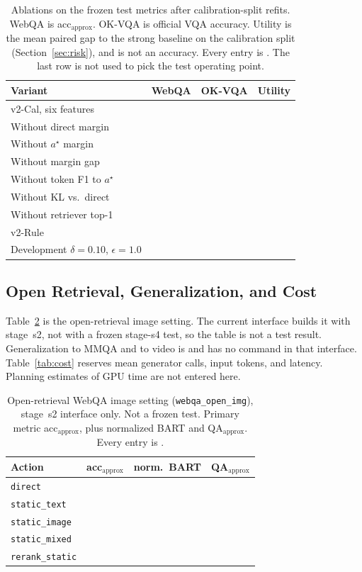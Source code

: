 \begin{table}[t]
\caption{Ablations on the frozen test metrics after calibration-split refits.
WebQA is acc$_{\mathrm{approx}}$.
OK-VQA is official VQA accuracy.
Utility is the mean paired gap to the strong baseline on the calibration split (Section~\ref{sec:risk}), and is not an accuracy.
Every entry is \ph{}.
The last row is not used to pick the test operating point.}
\label{tab:ablation}
\scriptsize
\setlength{\tabcolsep}{3pt}
\begin{tabular}{@{}lccc@{}}
\toprule
Variant & WebQA & OK-VQA & Utility \\
\midrule
v2-Cal, six features & \ph{} & \ph{} & \ph{} \\
Without direct margin & \ph{} & \ph{} & \ph{} \\
Without $a^{\star}$ margin & \ph{} & \ph{} & \ph{} \\
Without margin gap & \ph{} & \ph{} & \ph{} \\
Without token F1 to $a^{\star}$ & \ph{} & \ph{} & \ph{} \\
Without KL vs.\ direct & \ph{} & \ph{} & \ph{} \\
Without retriever top-1 & \ph{} & \ph{} & \ph{} \\
v2-Rule & \ph{} & \ph{} & \ph{} \\
Development $\delta=0.10$, $\epsilon=1.0$ & \ph{} & \ph{} & \ph{} \\
\bottomrule
\end{tabular}
\end{table}

\subsection{Open Retrieval, Generalization, and Cost}
\label{sec:extra}
Table~\ref{tab:open} is the open-retrieval image setting.
The current interface builds it with stage~s2, not with a frozen stage-s4 test, so the table is not a test result.
Generalization to MMQA and to video is \ph{} and has no command in that interface.
Table~\ref{tab:cost} reserves mean generator calls, input tokens, and latency.
Planning estimates of GPU time are not entered here.

\begin{table}[t]
\caption{Open-retrieval WebQA image setting (\texttt{webqa\_open\_img}), stage~s2 interface only.
Not a frozen test.
Primary metric acc$_{\mathrm{approx}}$, plus normalized BART and QA$_{\mathrm{approx}}$.
Every entry is \ph{}.}
\label{tab:open}
\small
\begin{tabular}{@{}lccc@{}}
\toprule
Action & acc$_{\mathrm{approx}}$ & norm.\ BART & QA$_{\mathrm{approx}}$ \\
\midrule
\texttt{direct} & \ph{} & \ph{} & \ph{} \\
\texttt{static\_text} & \ph{} & \ph{} & \ph{} \\
\texttt{static\_image} & \ph{} & \ph{} & \ph{} \\
\texttt{static\_mixed} & \ph{} & \ph{} & \ph{} \\
\texttt{rerank\_static} & \ph{} & \ph{} & \ph{} \\
\bottomrule
\end{tabular}
\end{table}

